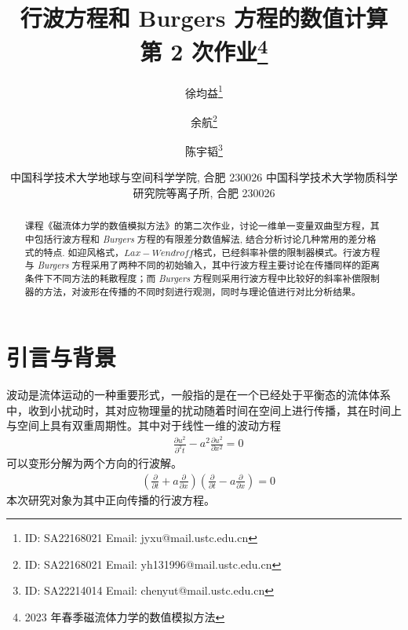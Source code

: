 \documentclass[10.5pt
]{article}
\def\Term{2023 年春季}
\def\Course{磁流体力学的数值模拟方法}
\begin{document}
\title{行波方程和 Burgers 方程的数值计算 \\
  第 2 次作业\footnote{\Term\Course}}

\author{徐均益\footnote{ID: SA22168021 Email: jyxu@mail.ustc.edu.cn}
  \and
  余航\footnote{ID: SA22168021 Email: yh131996@mail.ustc.edu.cn}
  \and
  陈宇韬\footnote{ID: SA22214014 Email: chenyut@mail.ustc.edu.cn}
}

\date{%
\scriptsize%
中国科学技术大学地球与空间科学学院, 合肥 230026
中国科学技术大学物质科学研究院等离子所, 合肥 230026
%
}


\maketitle

\begin{abstract}
课程《磁流体力学的数值模拟方法》的第二次作业，讨论一维单一变量双曲型方程，其中包括行波方程和 \textit{Burgers} 方程的有限差分数值解法,
结合分析讨论几种常用的差分格式的特点. 如迎风格式，$Lax-Wendroff$格式，已经斜率补偿的限制器模式。行波方程与 \textit{Burgers} 方程采用了两种不同的初始输入，其中行波方程主要讨论在传播同样的距离条件下不同方法的耗散程度；而 \textit{Burgers} 方程则采用行波方程中比较好的斜率补偿限制器的方法，对波形在传播的不同时刻进行观测，同时与理论值进行对比分析结果。
\end{abstract}

\section{引言与背景}
波动是流体运动的一种重要形式，一般指的是在一个已经处于平衡态的流体体系中，收到小扰动时，其对应物理量的扰动随着时间在空间上进行传播，其在时间上与空间上具有双重周期性。其中对于线性一维的波动方程
\begin{align}
& \frac{\partial u^2}{\partial^2 t} - a^2 \frac{\partial u^2}{\partial x^2} = 0
\label{EqnCon}
\end{align}
可以变形分解为两个方向的行波解。
\begin{align}
    & \left( \frac{\partial }{\partial t} + a \frac{\partial }{\partial x} \right) \left( \frac{\partial }{\partial t} - a \frac{\partial }{\partial x} \right)= 0
\label{EqnCon}
\end{align}
本次研究对象为其中正向传播的行波方程。
\end{document}
